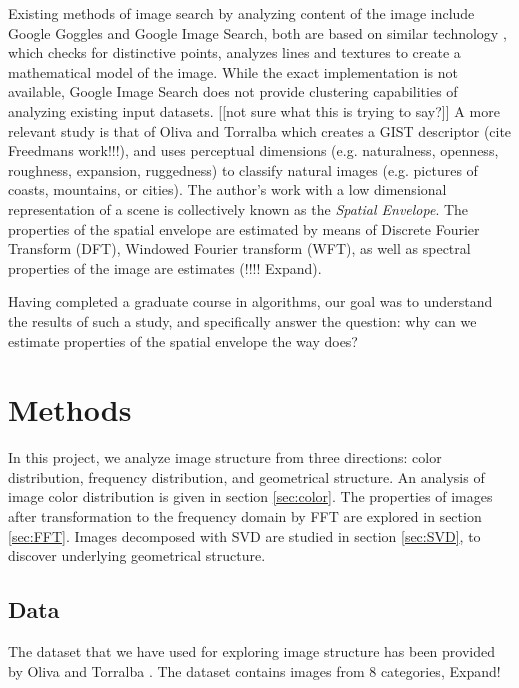 \documentclass{report}
\begin{document}
Existing methods of image search by analyzing content of the image include Google Goggles and Google Image Search, both are based on similar technology \cite{google_blog}, which checks for distinctive points, analyzes lines and textures to create a mathematical model of the image. {\color{red} While the exact implementation is not available, Google Image Search does not provide clustering capabilities of analyzing existing input datasets. [[not sure what this is trying to say?]]} A more relevant study is that of Oliva and Torralba \cite{gist_descriptor} which creates a GIST descriptor {\color{red}(cite Freedmans work!!!)}, and uses perceptual dimensions (e.g. naturalness, openness, roughness, expansion, ruggedness) to classify natural images (e.g. pictures of coasts, mountains, or cities). The author's work with a low dimensional representation of a scene is collectively known as the \emph{Spatial Envelope}. The properties of the spatial envelope are estimated by means of Discrete Fourier Transform (DFT), Windowed Fourier transform (WFT), as well as spectral properties of the image are estimates {\color{red}(!!!! Expand)}. 

Having completed a graduate course in algorithms, our goal was to understand the results of such a study, and specifically answer the question: why can we estimate properties of the spatial envelope the way \cite{gist_descriptor} does? 


\chapter{Methods}
In this project, we analyze image structure from three directions: color distribution, frequency distribution, and geometrical structure. An analysis of image color distribution is given in section \ref{sec:color}. The properties of images after transformation to the frequency domain by FFT are explored in section \ref{sec:FFT}. Images decomposed with SVD are studied in section \ref{sec:SVD}, to discover underlying geometrical structure.
 

\section{Data}
The dataset that we have used for exploring image structure has been provided by Oliva and Torralba \cite{gist_descriptor}. The dataset contains images from 8 categories, {\color{red} Expand!}
\end{document}
